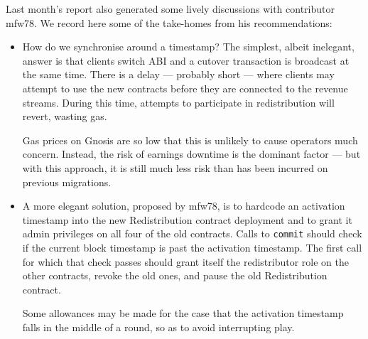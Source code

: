 Last month's report also generated some lively discussions with contributor mfw78. We record here some of the take-homes from his recommendations:
%
\begin{itemize}
  \item 
    How do we synchronise around a timestamp? 
    The simplest, albeit inelegant, answer is that clients switch ABI and a cutover transaction is broadcast at the same time.
    There is a delay — probably short — where clients may attempt to use the new contracts before they are connected to the revenue streams.
    During this time, attempts to participate in redistribution will revert, wasting gas.
    
    Gas prices on Gnosis are so low that this is unlikely to cause operators much concern.
    Instead, the risk of earnings downtime is the dominant factor — but with this approach, it is still much less risk than has been incurred on previous migrations.

  \item
    A more elegant solution, proposed by mfw78, is to hardcode an activation timestamp into the new Redistribution contract deployment and to grant it admin privileges on all four of the old contracts.
    Calls to \texttt{commit} should check if the current block timestamp is past the activation timestamp.
    The first call for which that check passes should grant itself the redistributor role on the other contracts, revoke the old ones, and pause the old Redistribution contract.
    
    Some allowances may be made for the case that the activation timestamp falls in the middle of a round, so as to avoid interrupting play.
\end{itemize}
